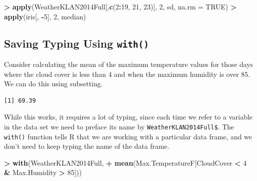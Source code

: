 \documentclass[]{krantz}
\makeatletter
\newenvironment{Shaded}{\begin{snugshade}}{\end{snugshade}}
\newcommand{\KeywordTok}[1]{\textcolor[rgb]{0.27,0.27,0.27}{\textbf{#1}}}
\newcommand{\DataTypeTok}[1]{\textcolor[rgb]{0.27,0.27,0.27}{#1}}
\newcommand{\DecValTok}[1]{\textcolor[rgb]{0.06,0.06,0.06}{#1}}
\newcommand{\StringTok}[1]{\textcolor[rgb]{0.5,0.5,0.5}{#1}}
\newcommand{\OtherTok}[1]{\textcolor[rgb]{0.37,0.37,0.37}{#1}}
\newcommand{\OperatorTok}[1]{\textcolor[rgb]{0.43,0.43,0.43}{\textbf{#1}}}
\newcommand{\NormalTok}[1]{#1}
\newenvironment{kframe}{%
\medskip{}
\setlength{\fboxsep}{.8em}
 \def\at@end@of@kframe{}%
 \ifinner\ifhmode%
  \def\at@end@of@kframe{\end{minipage}}%
  \begin{minipage}{\columnwidth}%
 \fi\fi%
 \def\FrameCommand##1{\hskip\@totalleftmargin \hskip-\fboxsep
 \colorbox{shadecolor}{##1}\hskip-\fboxsep
     \hskip-\linewidth \hskip-\@totalleftmargin \hskip\columnwidth}%
 \MakeFramed {\advance\hsize-\width
   \@totalleftmargin\z@ \linewidth\hsize
   \@setminipage}}%
 {\par\unskip\endMakeFramed%
 \at@end@of@kframe}
\renewenvironment{Shaded}{\begin{kframe}}{\end{kframe}}
\makeatother
\begin{document}
\begin{Shaded}
\begin{Highlighting}[]
\OperatorTok{>}\StringTok{ }\KeywordTok{apply}\NormalTok{(WeatherKLAN2014Full[,}\KeywordTok{c}\NormalTok{(}\DecValTok{2}\OperatorTok{:}\DecValTok{19}\NormalTok{, }\DecValTok{21}\NormalTok{, }\DecValTok{23}\NormalTok{)], }\DecValTok{2}\NormalTok{, sd, }\DataTypeTok{na.rm =} \OtherTok{TRUE}\NormalTok{)}
\OperatorTok{>}\StringTok{ }\KeywordTok{apply}\NormalTok{(iris[, }\OperatorTok{-}\DecValTok{5}\NormalTok{], }\DecValTok{2}\NormalTok{, median)}
\end{Highlighting}
\end{Shaded}

\subsection{\texorpdfstring{Saving Typing Using
\texttt{with()}}{Saving Typing Using with()}}\label{saving-typing-using-with}

Consider calculating the mean of the maximum temperature values for
those days where the cloud cover is less than 4 and when the maximum
humidity is over 85. We can do this using subsetting.

\begin{Shaded}
\end{Shaded}

\begin{verbatim}
[1] 69.39
\end{verbatim}

While this works, it requires a lot of typing, since each time we refer
to a variable in the data set we need to preface its name by
\texttt{WeatherKLAN2014Full\$}. The \texttt{with()} function tells R
that we are working with a particular data frame, and we don't need to
keep typing the name of the data frame.

\begin{Shaded}
\begin{Highlighting}[]
\OperatorTok{>}\StringTok{ }\KeywordTok{with}\NormalTok{(WeatherKLAN2014Full, }
\OperatorTok{+}\StringTok{      }\KeywordTok{mean}\NormalTok{(Max.TemperatureF[CloudCover }\OperatorTok{<}\StringTok{ }\DecValTok{4} \OperatorTok{&}\StringTok{ }\NormalTok{Max.Humidity }\OperatorTok{>}\StringTok{ }\DecValTok{85}\NormalTok{]))}
\end{Highlighting}
\end{Shaded}
\end{document}
